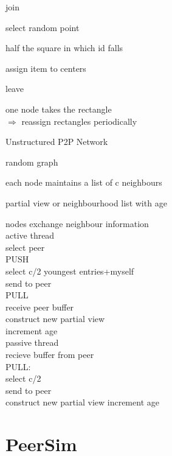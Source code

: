 \documentclass[ngerman,a4paper]{report}
\begin{document}
\begin{compactenum}
\begin{compactitem}
\item join\begin{compactitem}
\item select random point
\item half the square in which id falls
\item assign item to centers
\end{compactitem}
\item leave\begin{compactitem}
\item one node takes the rectangle\\
$\Rightarrow$ reassign rectangles periodically
\end{compactitem}
\end{compactitem}

Unstructured P2P Network\\
\begin{compactitem}
\item random graph
\item each node maintains a list of c neighbours
\item partial view or neighbourhood list  with age
\item nodes exchange neighbour information \\active thread\\ select peer\\

PUSH\\
select c/2 youngest entries+myself\\
send to peer\\

PULL\\
receive peer buffer\\
construct new partial view\\
increment age\\

passive thread\\
recieve buffer from peer\\

PULL:\\
select c/2\\
send to peer\\
construct new partial view
increment age\\

\end{compactitem}

\end{compactenum}


\chapter{PeerSim}
\end{document}
